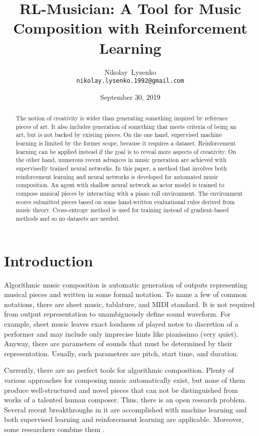 \documentclass{article}
\title{RL-Musician: A Tool for Music Composition with Reinforcement Learning}
\date{September 30, 2019}
\author{
  Nikolay~Lysenko\\
  \texttt{nikolay.lysenko.1992@gmail.com} \\
}
\begin{document}
\maketitle

\begin{abstract}
The notion of creativity is wider than generating something inspired by reference pieces of art. It also includes generation of something that meets criteria of being an art, but is not backed by existing pieces. On the one hand, supervised machine learning is limited by the former scope, because it requires a dataset. Reinforcement learning can be applied instead if the goal is to reveal more aspects of creativity. On the other hand, numerous recent advances in music generation are achieved with supervisedly trained neural networks. In this paper, a method that involves both reinforcement learning and neural networks is developed for automated music composition. An agent with shallow neural network as actor model is trained to compose musical pieces by interacting with a piano roll environment. The environment scores submitted pieces based on some hand-written evaluational rules derived from music theory. Cross-entropy method is used for training instead of gradient-based methods and so no datasets are needed.
\end{abstract}



\section{Introduction}
\label{sec:introduction}

Algorithmic music composition is automatic generation of outputs representing musical pieces and written in some formal notation. To name a few of common notations, there are sheet music, tablature, and MIDI standard. It is not required from output representation to unambiguously define sound waveform. For example, sheet music leaves exact loudness of played notes to discretion of a performer and may include only imprecise hints like pianissimo (very quiet). Anyway, there are parameters of sounds that must be determined by their representation. Usually, such parameters are pitch, start time, and duration.

Currently, there are no perfect tools for algorithmic composition. Plenty of various approaches for composing music automatically exist, but none of them produce well-structured and novel pieces that can not be distinguished from works of a talented human composer. Thus, there is an open research problem. Several recent breakthroughs in it are accomplished with machine learning and both supervised learning \cite{johnson2017generating, payne2019musenet} and reinforcement learning \cite{smith2012reinforcement} are applicable. Moreover, some researchers combine them \cite{jaques2016generating, kotecha2018bach, kumar2019polyphonic}.
\end{document}
